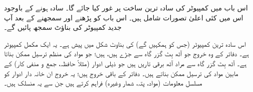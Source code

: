 اس باب میں کمپیوٹر کی سادہ ترین ساخت پر غور کیا جائے گا۔ سادہ ہونے کے باوجود اس میں   کئی   اعلیٰ  تصورات شامل ہیں۔ اس باب کو پڑھنے اور   سمجھنے  کے بعد آپ جدید کمپیوٹر کی بناؤٹ سمجھ پائیں گے۔

اس سادہ  ترین کمپیوٹر  (جس کو ہمکہیں گے) کی  بناوٹ شکل  میں پیش ہے۔ یہ ایک مکمل کمپیوٹر ہے۔   دفاتر کے    وہ خروج جو آٹھ بِٹ گزر گاہ     سے جڑے ہیں،      ہیں؛  جو  مواد کی  منظم ترسیل ممکن بناتا  ہے۔ آٹھ بِٹ  گزر گاہ سے مراد آٹھ برقی تاریں ہیں جو    ذیلی ادوار (مثلاً حافظہ، جمع و منفی کار)  کے مابین مواد کی ترسیل ممکن بناتے ہیں۔ دفاتر کے باقی خروج  ہیں؛ یہ خروج   ان  خانہ دار  ادوار کو مسلسل   معلومات (مواد، پتہ، شمار وغیرہ)  فراہم کرتے ہیں جن سے یہ منسلک ہیں۔

